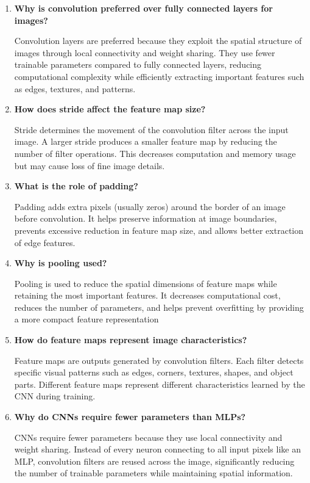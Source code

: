 \documentclass[12pt,a4paper]{article}
\begin{document}
\begin{enumerate}

\item \textbf{Why is convolution preferred over fully connected layers for images?}

Convolution layers are preferred because they exploit the spatial structure of images through local connectivity and weight sharing. They use fewer trainable parameters compared to fully connected layers, reducing computational complexity while efficiently extracting important features such as edges, textures, and patterns.

\item \textbf{How does stride affect the feature map size?}

Stride determines the movement of the convolution filter across the input image. A larger stride produces a smaller feature map by reducing the number of filter operations. This decreases computation and memory usage but may cause loss of fine image details.

\item \textbf{What is the role of padding?}

Padding adds extra pixels (usually zeros) around the border of an image before convolution. It helps preserve information at image boundaries, prevents excessive reduction in feature map size, and allows better extraction of edge features.

\item \textbf{Why is pooling used?}

Pooling is used to reduce the spatial dimensions of feature maps while retaining the most important features. It decreases computational cost, reduces the number of parameters, and helps prevent overfitting by providing a more compact feature representation

\item \textbf{How do feature maps represent image characteristics?}

Feature maps are outputs generated by convolution filters. Each filter detects specific visual patterns such as edges, corners, textures, shapes, and object parts. Different feature maps represent different characteristics learned by the CNN during training.

\item \textbf{Why do CNNs require fewer parameters than MLPs?}

CNNs require fewer parameters because they use local connectivity and weight sharing. Instead of every neuron connecting to all input pixels like an MLP, convolution filters are reused across the image, significantly reducing the number of trainable parameters while maintaining spatial information.

\end{enumerate}
\end{document}
